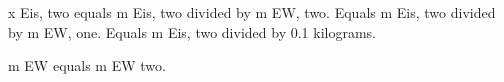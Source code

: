 x Eis, two equals m Eis, two divided by m EW, two.  
Equals m Eis, two divided by m EW, one.  
Equals m Eis, two divided by 0.1 kilograms.  

m EW equals m EW two.